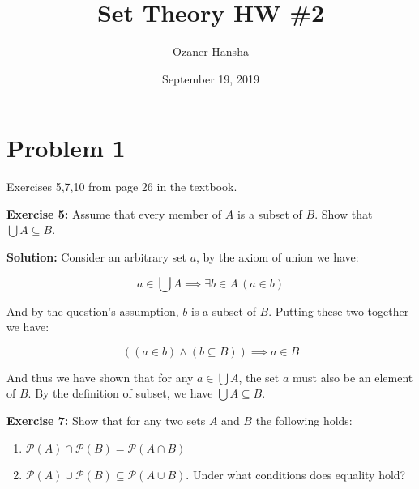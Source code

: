 \documentclass{article}
\begin{document}
\title{Set Theory HW \#2}
\author{Ozaner Hansha}
\date{September 19, 2019}
\maketitle


\newcommand{\pset}[1]{\mathcal P(#1)}
\newcommand{\psetp}[1]{\mathcal P(#1)}
\newcommand{\and}{\wedge}
\newcommand{\OR}{\vee}
\newcommand{\pair}[2]{(#1,#2))}

\section*{Problem 1}
Exercises 5,7,10 from page 26 in the textbook.
\bigskip

\noindent\textbf{Exercise 5:} Assume that every member of $A$ is a subset of $B$. Show that $\bigcup A\subseteq B$.
\bigskip

\noindent\textbf{Solution:} Consider an arbitrary set $a$, by the axiom of union we have: 

\begin{equation*}
    a\in\bigcup A\implies \exists b\in A\, (a\in b)
\end{equation*}

And by the question's assumption, $b$ is a subset of $B$. Putting these two together we have:

\begin{equation*}
    ((a\in b)\and (b\subseteq B))\implies a\in B\tag{def. of subset}
\end{equation*}

And thus we have shown that for any $a\in\bigcup A$, the set $a$ must also be an element of $B$. By the definition of subset, we have $\bigcup A\subseteq B$.

\bigskip

\noindent\textbf{Exercise 7:} Show that for any two sets $A$ and $B$ the following holds:

\begin{enumerate}[label=\alph*)]
    \item $\pset A\cap\pset B=\psetp{A\cap B}$
    \item $\pset A\cup\pset B\subseteq\psetp{A\cup B}$. Under what conditions does equality hold?
\end{enumerate}
\smallskip
\end{document}
